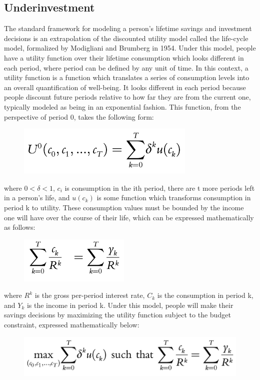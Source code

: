 \documentclass[10pt,twocolumn]{article}
\begin{document}
\subsection{Underinvestment}
The standard framework for modeling a person’s lifetime savings and investment decisions is an extrapolation of the discounted utility model called the life-cycle model, formalized by Modigliani and Brumberg in 1954.\cite{modigliani} Under this model, people have a utility function over their lifetime consumption which looks different in each period, where period can be defined by any unit of time. In this context, a utility function is a function which translates a series of consumption levels into an overall quantification of well-being. It looks different in each period because people discount future periods relative to how far they are from the current one, typically modeled as being in an exponential fashion. This function, from the perspective of period 0, takes the following form:
\begin{figure}[h]
    \centering
    \includegraphics[width=0.8\linewidth]{images/Underinvestment1.png}
\end{figure}

\noindent where $0 < \delta < 1$, $c_i$ is consumption in the ith period, there are t more periods left in a person's life, and $u(c_k)$ is some function which transforms consumption in period k to utility. These consumption values must be bounded by the income one will have over the course of their life, which can be expressed mathematically as follows:
\begin{figure}[h]
    \centering
    \includegraphics[width=0.5\linewidth]{images/underinvestment2.png}
\end{figure}

\noindent where $R^k$ is the gross per-period interest rate, $C_k$ is the consumption in period k, and $Y_k$ is the income in period k. Under this model, people will make their savings decisions by maximizing the utility function subject to the budget constraint, expressed mathematically below:
\begin{figure}[h]
    \centering
    \includegraphics[width=1\linewidth]{images/underinvestment3.png}
\end{figure}
\end{document}
